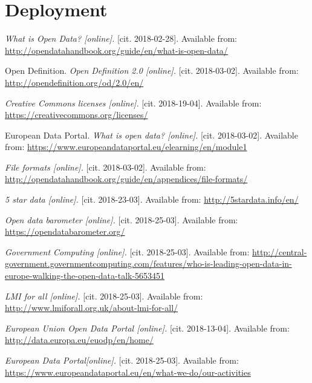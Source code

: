 \documentclass[thesis=B,english]{FITthesis}[2012/06/26]
\begin{document}
	\section{Deployment}
	
\begin{conclusion}
\end{conclusion}


\begin{thebibliography}{9}
\textit{What is Open Data? [online].}
[cit. 2018-02-28]. Available from: \url{http://opendatahandbook.org/guide/en/what-is-open-data/} 

Open Definition.
\textit{Open Definition 2.0 [online].}
[cit. 2018-03-02]. Available from: \url{http://opendefinition.org/od/2.0/en/} 

\textit{Creative Commons licenses [online].}
[cit. 2018-19-04]. Available from: \url{https://creativecommons.org/licenses/}

European Data Portal.
\textit{What is open data? [online].}
[cit. 2018-03-02]. Available from: \url{https://www.europeandataportal.eu/elearning/en/module1} 

\textit{File formats [online].}
[cit. 2018-03-02]. Available from: \url{http://opendatahandbook.org/guide/en/appendices/file-formats/} 

\textit{5 star data [online].}
[cit. 2018-23-03]. Available from: \url{http://5stardata.info/en/} 

\textit{Open data barometer [online].}
[cit. 2018-25-03]. Available from: \url{https://opendatabarometer.org/}

\textit{Government Computing [online].}
[cit. 2018-25-03]. Available from: \url{http://central-government.governmentcomputing.com/features/who-is-leading-open-data-in-europe-walking-the-open-data-talk-5653451}

\textit{LMI for all [online].}
[cit. 2018-25-03]. Available from: \url{http://www.lmiforall.org.uk/about-lmi-for-all/}

\textit{European Union Open Data Portal [online].}
[cit. 2018-13-04]. Available from: \url{http://data.europa.eu/euodp/en/home/}

\textit{European Data Portal[online].}
[cit. 2018-25-03]. Available from: \url{https://www.europeandataportal.eu/en/what-we-do/our-activities}


\end{thebibliography}
\end{document}
